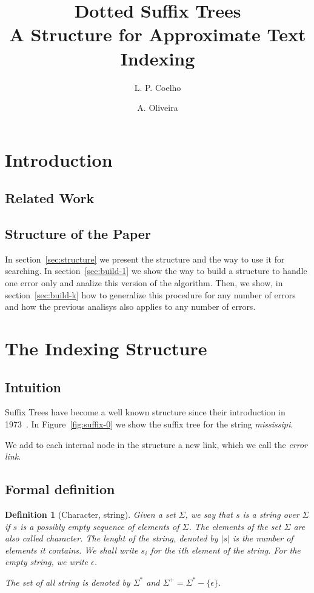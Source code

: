 \documentclass[a4paper,10pt]{article}
\title{Dotted Suffix Trees\\A Structure for Approximate Text Indexing}
\author{L. P. Coelho \and A. Oliveira}
\newcommand{\putstring}[1]{\textsl{#1}}
\newtheorem{definition}{Definition}
\begin{document}
\maketitle

\begin{abstract}

\end{abstract}

\section{Introduction}



\subsection{Related Work}
\subsection{Structure of the Paper}

In section~\ref{sec:structure} we present the structure and the way to use it for searching. In section~\ref{sec:build-1} we show the way to build a structure to handle one error only and analize this version of the algorithm. Then, we show, in section~\ref{sec:build-k} how to generalize this procedure for any number of errors and how the previous analisys also applies to any number of errors.

\section{The Indexing Structure}

\subsection{Intuition}
Suffix Trees have become a well known structure since their introduction in 1973~\cite{weiner}. In Figure~\ref{fig:suffix-0} we show the suffix tree for the string \putstring{mississipi}.

We add to each internal node in the structure a new link, which we call the \emph{error link}. 

\subsection{Formal definition}

\begin{definition}[Character, string]
Given a set $\Sigma$, we say that $s$ is a \emph{string over $\Sigma$} if $s$ is a possibly empty sequence of elements of $\Sigma$. The elements of the set $\Sigma$ are also called \emph{character}. The lenght of the string, denoted by $|s|$ is the number of elements it contains. We shall write $s_i$ for the $i$th element of the string. For the empty string, we write $\epsilon$.

The set of all string is denoted by $\Sigma^*$ and $\Sigma^+=\Sigma^*-\{\epsilon\}$.
\end{definition}
\end{document}
